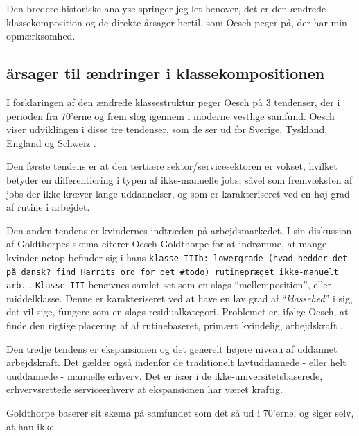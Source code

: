Den bredere historiske analyse springer jeg let henover, det er den ændrede klassekomposition og de direkte årsager hertil, som Oesch peger på, der har min opmærksomhed. 

%
\subsection{årsager til ændringer i klassekompositionen \label{  subsec teori klasse Oesch aarsager}}
%


I forklaringen af den ændrede klassestruktur peger Oesch på 3 tendenser, der i perioden fra 70'erne og frem slog igennem i moderne vestlige samfund. Oesch viser udviklingen i disse tre tendenser, som de ser ud for Sverige, Tyskland, England og Schweiz \parencite[30]{Oesch2006a}.

Den første tendens er at den tertiære sektor/servicesektoren er vokset, hvilket betyder en differentiering i typen af ikke-manuelle jobs, såvel som fremvæksten af jobs der ikke kræver lange uddannelser, og som er karakteriseret ved en høj grad af rutine i arbejdet.

Den anden tendens er kvindernes indtræden på arbejdsmarkedet. I sin diskussion af Goldthorpes skema citerer Oesch Goldthorpe for at indrømme, at mange kvinder netop befinder sig i hans \texttt{klasse IIIb: lowergrade (hvad hedder det på dansk? find Harrits ord for det \#todo) rutinepræget ikke-manuelt arb.} \parencite[44]{Oesch2006a}. \texttt{Klasse III} benævnes samlet set som en slags “mellemposition”, eller middelklasse. Denne er karakteriseret ved at have en lav grad af “\emph{klassehed}” i sig, det vil sige, fungere som en slags residualkategori. Problemet er, ifølge Oesch, at finde den rigtige placering af af rutinebaseret, primært kvindelig, arbejdskraft \parencite[45]{Oesch2006a}. 

Den tredje tendens er ekspansionen og det generelt højere niveau af uddannet arbejdskraft. Det gælder også indenfor de traditionelt lavtuddannede - eller helt uuddannede - manuelle erhverv. Det er især i de ikke-universitetsbaserede, erhvervsrettede serviceerhverv at ekspansionen har været kraftig.  





Goldthorpe baserer sit skema på samfundet som det så ud i 70'erne, og siger selv, at han ikke  






